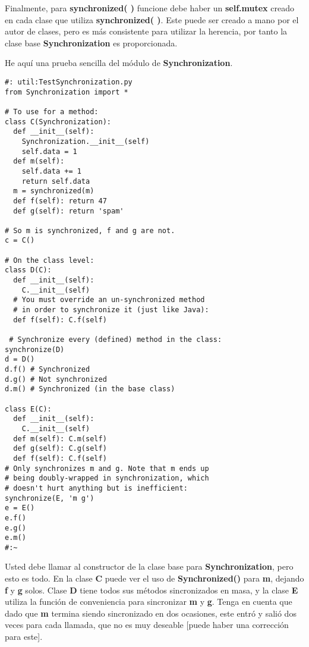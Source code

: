 Finalmente, para \textbf{synchronized( )} funcione debe haber un \textbf{self.mutex} creado en cada clase que utiliza \textbf{synchronized( )}. Este puede ser creado a mano por el autor de clases, pero es más consistente para utilizar la herencia, por tanto la clase base \textbf{Synchronization} es proporcionada.  \newline

He aquí una prueba sencilla del módulo de \textbf{Synchronization}. \newline

\begin{lstlisting} 
#: util:TestSynchronization.py 
from Synchronization import *  

# To use for a method: 
class C(Synchronization): 
  def __init__(self): 
    Synchronization.__init__(self) 
    self.data = 1 
  def m(self): 
    self.data += 1 
    return self.data 
  m = synchronized(m) 
  def f(self): return 47 
  def g(self): return 'spam'
  
# So m is synchronized, f and g are not. 
c = C() 

# On the class level: 
class D(C): 
  def __init__(self): 
    C.__init__(self) 
  # You must override an un-synchronized method 
  # in order to synchronize it (just like Java): 
  def f(self): C.f(self) 
  
 # Synchronize every (defined) method in the class: 
synchronize(D) 
d = D() 
d.f() # Synchronized 
d.g() # Not synchronized 
d.m() # Synchronized (in the base class) 

class E(C): 
  def __init__(self): 
    C.__init__(self) 
  def m(self): C.m(self) 
  def g(self): C.g(self) 
  def f(self): C.f(self) 
# Only synchronizes m and g. Note that m ends up 
# being doubly-wrapped in synchronization, which 
# doesn't hurt anything but is inefficient: 
synchronize(E, 'm g') 
e = E() 
e.f() 
e.g() 
e.m() 
#:~
\end{lstlisting}

Usted debe llamar al constructor de la clase base para \textbf{Synchronization}, pero esto es todo. En la clase \textbf{C} puede ver el uso de \textbf{Synchronized()} para \textbf{m}, dejando \textbf{f} y \textbf{g} solos. Clase \textbf{D} tiene todos sus métodos sincronizados en masa, y la clase \textbf{E} utiliza la función de conveniencia para sincronizar \textbf{m} y \textbf{g}. Tenga en cuenta que dado que \textbf{m} termina siendo sincronizado en dos ocasiones, este entró y salió dos veces para cada llamada, que no es muy deseable [puede haber una corrección para este].     \newline
      
